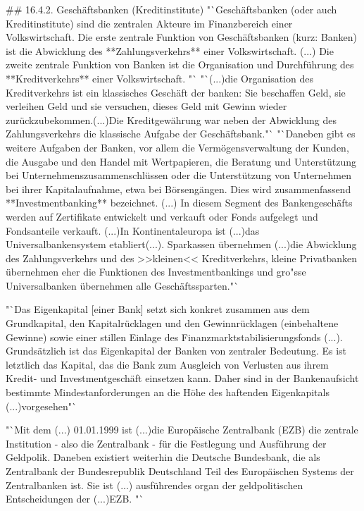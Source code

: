 \documentclass[
      onecolumn,
      a4paper,
      abstracton,
      parskip=half
      ,final
      ]{scrartcl}
\begin{document}
## 16.4.2. Gesch{\"a}ftsbanken (Kreditinstitute)
\citep[vgl.][S.512-13]{Basseler2010} "`Gesch{\"a}ftsbanken (oder auch Kreditinstitute) sind die zentralen Akteure im Finanzbereich einer Volkswirtschaft. Die erste zentrale Funktion von Gesch{\"a}ftsbanken (kurz: Banken) ist die Abwicklung des **Zahlungsverkehrs** einer Volkswirtschaft. (...) Die zweite zentrale Funktion von Banken ist die Organisation und Durchf{\"u}hrung des **Kreditverkehrs** einer Volkswirtschaft. "`
"`(...)die Organisation des Kreditverkehrs ist ein klassisches Gesch{\"a}ft der banken: Sie beschaffen Geld, sie verleihen Geld und sie versuchen, dieses Geld mit Gewinn wieder zur{\"u}ckzubekommen.(...)Die Kreditgew{\"a}hrung war neben der Abwicklung des Zahlungsverkehrs die klassische Aufgabe der Gesch{\"a}ftsbank."`
 "`Daneben gibt es weitere Aufgaben der Banken, vor allem die Verm{\"o}gensverwaltung der Kunden, die Ausgabe und den Handel mit Wertpapieren, die Beratung und Unterst{\"u}tzung bei Unternehmenszusammenschl{\"u}ssen oder die Unterst{\"u}tzung von Unternehmen bei ihrer Kapitalaufnahme, etwa bei B{\"o}rseng{\"a}ngen. Dies wird zusammenfassend **Investmentbanking** bezeichnet. (...) In diesem Segment des Bankengesch{\"a}fts  werden auf Zertifikate entwickelt und verkauft oder Fonds aufgelegt und Fondsanteile verkauft. (...)In Kontinentaleuropa ist (...)das Universalbankensystem etabliert(...). Sparkassen {\"u}bernehmen (...)die Abwicklung des Zahlungsverkehrs und des >>kleinen<< Kreditverkehrs, kleine Privatbanken {\"u}bernehmen eher die Funktionen des Investmentbankings und gro{"ss}e Universalbanken {\"u}bernehmen alle Gesch{\"a}ftssparten."`

\citep[vgl.][S.515]{Basseler2010} "`Das Eigenkapital [einer Bank] setzt sich konkret zusammen aus dem Grundkapital, den Kapitalr{\"u}cklagen und den Gewinnr{\"u}cklagen (einbehaltene Gewinne) sowie einer stillen Einlage des Finanzmarktstabilisierungsfonds (...). Grunds{\"a}tzlich ist das Eigenkapital der Banken von zentraler Bedeutung. Es ist letztlich das Kapital, das die Bank zum Ausgleich von Verlusten aus ihrem Kredit- und Investmentgesch{\"a}ft einsetzen kann.  Daher sind in der Bankenaufsicht bestimmte Mindestanforderungen an die H{\"o}he des haftenden Eigenkapitals (...)vorgesehen"`

\citep[vgl.][S.512]{Basseler2010}  "`Mit dem (...) 01.01.1999 ist (...)die Europ{\"a}ische Zentralbank (EZB) die zentrale Institution - also die Zentralbank - f{\"u}r die Festlegung und Ausf{\"u}hrung der Geldpolik. Daneben existiert weiterhin die Deutsche Bundesbank, die als Zentralbank der Bundesrepublik Deutschland Teil des Europ{\"a}ischen Systems der Zentralbanken ist. Sie ist (...) ausf{\"u}hrendes organ der geldpolitischen Entscheidungen der (...)EZB. "`
\end{document}
